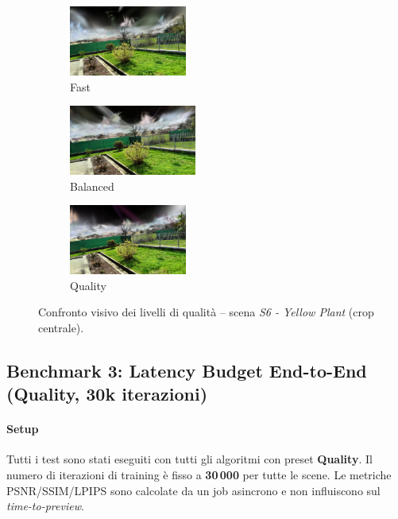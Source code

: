 \begin{figure}[H]
	\centering
	\begin{subfigure}{0.32\textwidth}
		\includegraphics[width=\linewidth, height=2.3cm, trim={80 40 80 40}, clip]{images/benchmarks/yellow_plant_taming_fast.jpg}
		\caption{Fast}
	\end{subfigure}
	\hfill
	\begin{subfigure}{0.32\textwidth}
		\includegraphics[width=\linewidth, height=2.3cm, trim={80 40 80 40}, clip]{images/benchmarks/yellow_plant_taming_balanced.jpg}
		\caption{Balanced}
	\end{subfigure}
	\hfill
	\begin{subfigure}{0.32\textwidth}
		\includegraphics[width=\linewidth, height=2.3cm, trim={80 40 80 40}, clip]{images/benchmarks/yellow_plant_taming_quality.jpg}
		\caption{Quality}
	\end{subfigure}
	\caption{Confronto visivo dei livelli di qualit\`a -- scena \textit{S6 - Yellow Plant} (crop centrale).}
	\label{fig:yellow_plant_quality_comparison}
\end{figure}


\subsection{Benchmark 3: Latency Budget End-to-End (Quality, 30k iterazioni)}
\label{subsec:latency_budget_inria}

\paragraph{Setup}
Tutti i test sono stati eseguiti con tutti gli algoritmi con preset \textbf{Quality}.
Il numero di iterazioni di training è fisso a \textbf{30\,000} per tutte le scene.  
Le metriche PSNR/SSIM/LPIPS sono calcolate da un job asincrono e non influiscono sul \emph{time-to-preview}.

